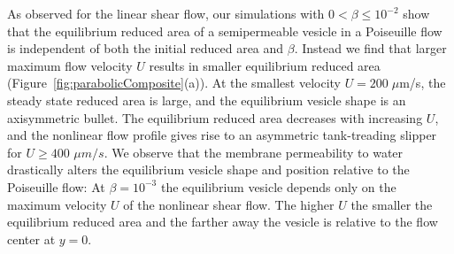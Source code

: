 \documentclass[prb,preprint,showpacs,preprintnumbers,amsmath,amssymb,longbibliography]{revtex4-1}
\begin{document}
As observed for the linear shear flow, our simulations with $0<\beta\le 10^{-2}$ 
show that the equilibrium reduced area of a semipermeable vesicle in a
Poiseuille flow is independent of both the initial reduced area and
$\beta$. Instead we find that larger maximum flow velocity $U$ results
in smaller equilibrium reduced area
(Figure~\ref{fig:parabolicComposite}(a)). At the smallest velocity $U=
200\; \mu$m/s, the steady state reduced area is large, and the
equilibrium vesicle shape is an axisymmetric bullet. The equilibrium
reduced area decreases with increasing $U$, and the nonlinear flow
profile gives rise to an asymmetric tank-treading slipper for $U\ge 400$
$\mu m/s$. We observe that the membrane permeability to water
drastically alters the equilibrium vesicle shape and position relative
to the Poiseuille flow: At $\beta=10^{-3}$ the equilibrium vesicle
depends only on the maximum velocity $U$ of the nonlinear shear flow.
The higher $U$ the smaller the equilibrium reduced area and the farther
away the vesicle is relative to the flow center at $y=0$.

\end{document}
